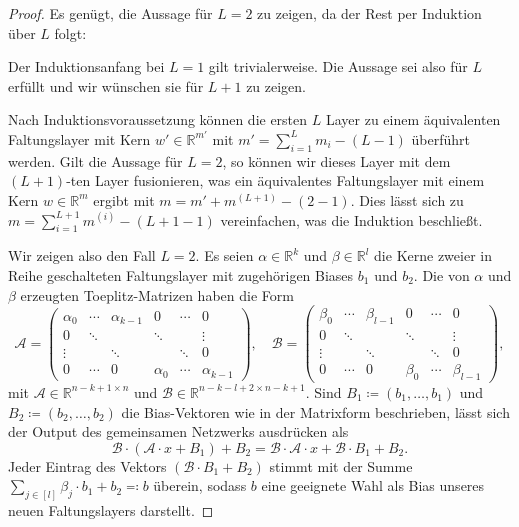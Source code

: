 \documentclass[paper=a4, 	%
		fontsize=11pt,
		abstract=true, 	%
		headsepline, 	%
		notitlepage	%
		]{scrartcl}
\theoremstyle{definition}
\newcommand{\R}{\mathbb{R}}
\newcommand{\fNat}[1]{[ #1 ]}
\begin{document}
\begin{proof}
    Es genügt, die Aussage für $L=2$ zu zeigen, da der Rest per Induktion über $L$ folgt:

    Der Induktionsanfang bei $L=1$ gilt trivialerweise.
    Die Aussage sei also für $L$ erfüllt und wir wünschen sie für $L+1$ zu zeigen.
        
    Nach Induktionsvoraussetzung können die ersten $L$ Layer zu einem äquivalenten Faltungslayer mit Kern $w'\in \R^{m'}$ mit $m'=\sum_{i=1}^L m_i - (L-1)$ überführt werden.
    Gilt die Aussage für $L=2$, so können wir dieses Layer mit dem $(L+1)$-ten Layer fusionieren, was ein äquivalentes Faltungslayer mit einem Kern $w\in\R^m$ ergibt mit $m = m' + m^{(L+1)} - (2-1)$.
    Dies lässt sich zu $m = \sum_{i=1}^{L+1} m^{(i)} - (L+1 - 1) $ vereinfachen, was die Induktion beschließt.
    
    Wir zeigen also den Fall $L=2$. Es seien $\alpha\in \R^k$ und $\beta\in\R^l$ die Kerne zweier in Reihe geschalteten Faltungslayer mit zugehörigen Biases $b_1$ und $b_2$.
    Die von $\alpha$ und $\beta$ erzeugten Toeplitz-Matrizen haben die Form
    \setlength\arraycolsep{2pt}
    \def\arraystretch{0.5}
    \[
        \mathcal{A} = \left(
            \begin{matrix}
                \alpha_0 & \cdots & \alpha_{k-1} & 0 & \cdots & 0 \\
                0 & \ddots & & \ddots  & & \vdots \\
                \vdots  & & \ddots & & \ddots & 0 \\[4pt]
                    0 & \cdots & 0 & \alpha_0 & \cdots & \alpha_{k-1}
            \end{matrix}
        \right),\quad
        \mathcal{B} = \left(
            \begin{matrix}
                \beta_0 & \cdots & \beta_{l-1} & 0 & \cdots & 0 \\
                0 & \ddots & & \ddots  & & \vdots \\
                \vdots  & & \ddots & & \ddots & 0 \\[4pt]
                    0 & \cdots & 0 & \beta_0 & \cdots & \beta_{l-1}
            \end{matrix}
        \right),
    \]
    mit $\mathcal{A}\in\R^{n - k + 1\times n}$ und $\mathcal{B}\in \R^{n-k-l+2 \times n-k+1}$.
    Sind $B_1\coloneqq (b_1,\dots,b_1)$ und $B_2\coloneqq (b_2,\dots,b_2)$ die Bias-Vektoren wie in der Matrixform beschrieben, lässt sich der Output des gemeinsamen Netzwerks ausdrücken als
    \[
        \mathcal{B}\cdot \left( \mathcal{A}\cdot x + B_1 \right) + B_2
        = \mathcal{B}\cdot \mathcal{A}\cdot x + \mathcal{B}\cdot B_1 + B_2.
    \]
    Jeder Eintrag des Vektors $(\mathcal{B}\cdot B_1 + B_2)$ stimmt mit der Summe $\sum_{j\in\fNat{l}} \beta_j\cdot b_1 + b_2 \eqqcolon b$ überein, sodass $b$ eine geeignete Wahl als Bias unseres neuen Faltungslayers darstellt.
    

\end{proof}
\end{document}
